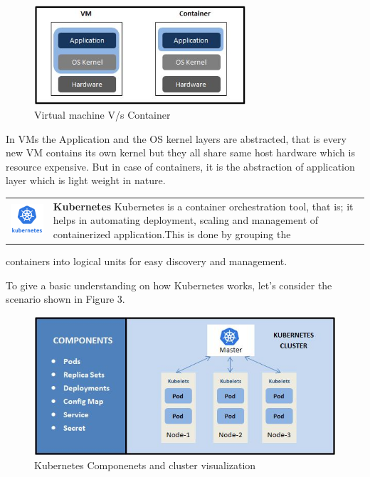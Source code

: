 \documentclass[12pt]{article}
\begin{document}
\begin{figure}[htbp]
\begin{center}
\includegraphics[width=0.7\textwidth]{vm.jpg}
\end{center}
\caption{Virtual machine V/s Container}
\end{figure}

In VMs the Application and the OS kernel layers are abstracted, that is every new VM contains its own kernel but they all share same host hardware which is resource expensive. But in case of containers, it is the abstraction of application layer which is light weight in nature.\\


\begin{tabular}{C{3.8cm}  L{11cm}}
        \includegraphics[width=3.8cm]{k8s.png} & {\Large{\textbf{Kubernetes}}} \newline 
        Kubernetes is a container orchestration tool, that is; it helps in automating deployment, scaling and management of containerized application.This is done by grouping the
\end{tabular}
   containers into logical units for easy discovery and management.

To give a basic understanding on how Kubernetes works, let’s consider the scenario shown in Figure 3.

\begin{figure}[htbp]
\begin{center}
\includegraphics[width=1\textwidth]{kube.jpg}
\end{center}
\caption{Kubernetes Componenets and cluster visualization}
\end{figure}
\end{document}
